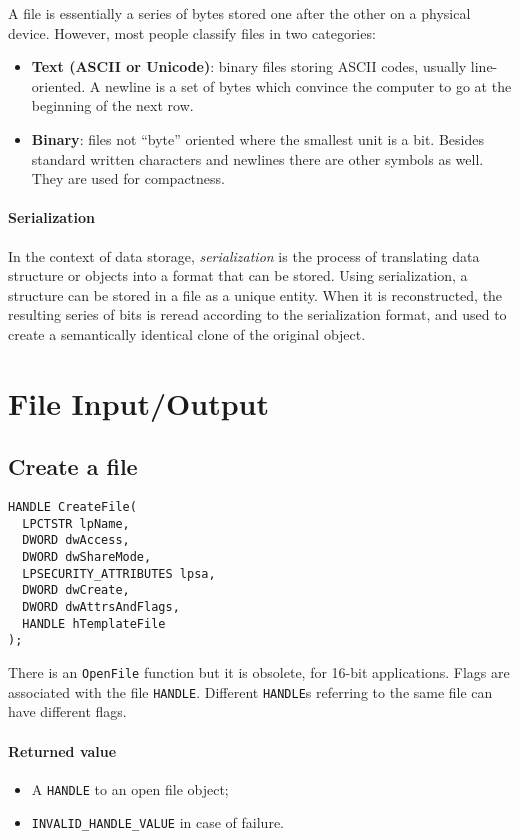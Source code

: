 \bigskip

A file is essentially a series of bytes stored one after the other on a physical device. However, most people classify files in two categories:
\begin{itemize}
\item \textbf{Text (ASCII or Unicode)}: binary files storing ASCII codes, usually line-oriented. A newline is a set of bytes which convince the computer to go at the beginning of the next row.
\item \textbf{Binary}: files not ``byte'' oriented where the smallest unit is a bit. Besides standard written characters and newlines there are other symbols as well. They are used for compactness.
\end{itemize}

\paragraph{Serialization}
In the context of data storage, \emph{serialization} is the process of translating data structure or objects into a format that can be stored. Using serialization, a structure can be stored in a file as a unique entity. When it is reconstructed, the resulting series of bits is reread according to the serialization format, and used to create a semantically identical clone of the original object.

\section{File Input/Output}
\subsection{Create a file}
\begin{verbatim}
HANDLE CreateFile(
  LPCTSTR lpName,
  DWORD dwAccess,
  DWORD dwShareMode,
  LPSECURITY_ATTRIBUTES lpsa,
  DWORD dwCreate,
  DWORD dwAttrsAndFlags,
  HANDLE hTemplateFile
);
\end{verbatim}

There is an \texttt{OpenFile} function but it is obsolete, for 16-bit applications. Flags are associated with the file \texttt{HANDLE}. Different \texttt{HANDLE}s referring to the same file can have different flags.

\paragraph{Returned value}
\begin{itemize}
\item A \texttt{HANDLE} to an open file object;
\item \texttt{INVALID\_HANDLE\_VALUE} in case of failure.
\end{itemize}

